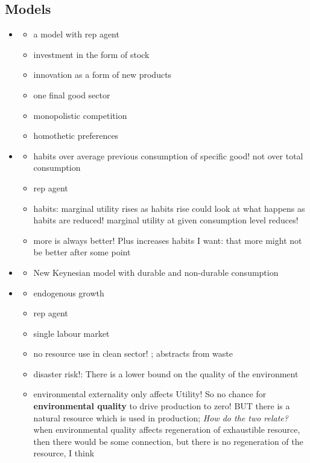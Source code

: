 \subsection{Models}
\begin{itemize}
\item \cite{Bilbiie2012EndogenousCycles}
\begin{itemize}
\item a model with rep agent
\item investment in the form of stock 
\item innovation as a form of new products
\item one final good sector
\item monopolistic competition
\item homothetic preferences
\end{itemize}
\item \cite{Ravn2006DeepHabits}
\begin{itemize}
 \item habits over average previous consumption of specific good! not over total consumption
 \item rep agent 
 \item habits: marginal utility rises as habits rise \ar could look at what happens as habits are reduced! \ar marginal utility at given consumption level reduces!
 \item more is always better! Plus increases habits \ar I want: that more might not be better after some point
\end{itemize}
\item \cite{McKay2021LumpyPolicy}
\begin{itemize}
\item New Keynesian model with durable and non-durable consumption 
\end{itemize}
\item \cite{Acemoglu2012TheChange}
\begin{itemize}
\item endogenous growth
\item rep agent
\item single labour market
\item no resource use in clean sector! ; abstracts from waste
\item disaster risk!: There is a lower bound on the quality of the environment 
\item environmental externality only affects Utility! So no chance for \textbf{environmental quality} to drive production to zero!
BUT there is a natural resource which is used in production; \textit{How do the two relate?} \ar when environmental quality affects regeneration of exhaustible resource, then there would be some connection, but there is no regeneration of the resource, I think

\end{itemize}
\end{itemize}
